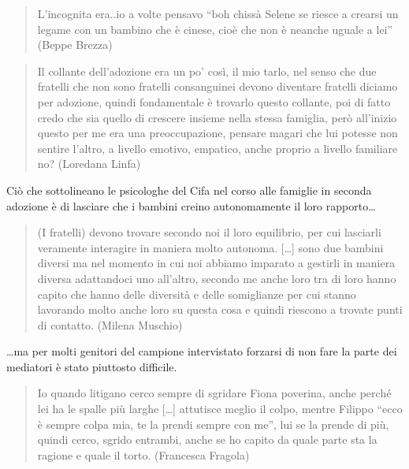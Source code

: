 \documentclass[12pt,oneside,svgnames]{memoir}
\newenvironment{quotationb}%
{\color{maincolor}\begin{leftbar}\begin{quotation}}%
{\end{quotation}\end{leftbar}\ignorespacesafterend}
\begin{document}
\begin{quotationb}
L'incognita era..io a volte pensavo ``boh chissà Selene se riesce a
crearsi un legame con un bambino che è cinese, cioè che non è neanche
uguale a lei'' (Beppe Brezza)
\end{quotationb}

\begin{quotationb}
Il collante dell'adozione era un po' così, il mio tarlo, nel senso che
due fratelli che non sono fratelli consanguinei devono diventare
fratelli diciamo per adozione, quindi fondamentale è trovarlo questo
collante, poi di fatto credo che sia quello di crescere insieme nella
stessa famiglia, però all'inizio questo per me era una preoccupazione,
pensare magari che lui potesse non sentire l'altro, a livello emotivo,
empatico, anche proprio a livello familiare no? (Loredana Linfa)
\end{quotationb}

Ciò che sottolineano le psicologhe del Cifa nel corso alle famiglie in
seconda adozione è di lasciare che i bambini creino autonomamente il
loro rapporto\ldots{}

\begin{quotationb}
(I fratelli) devono trovare secondo noi il loro equilibrio, per cui
lasciarli veramente interagire in maniera molto autonoma. {[}\ldots{}{]}
sono due bambini diversi ma nel momento in cui noi abbiamo imparato a
gestirli in maniera diversa adattandoci uno all'altro, secondo me anche
loro tra di loro hanno capito che hanno delle diversità e delle
somiglianze per cui stanno lavorando molto anche loro su questa cosa e
quindi riescono a trovate punti di contatto. (Milena Muschio)
\end{quotationb}

\ldots{}ma per molti genitori del campione intervistato forzarsi di non
fare la parte dei mediatori è stato piuttosto difficile.

\begin{quotationb}
Io quando litigano cerco sempre di sgridare Fiona poverina, anche perché
lei ha le spalle più larghe {[}\ldots{}{]} attutisce meglio il colpo,
mentre Filippo ``ecco è sempre colpa mia, te la prendi sempre con me'',
lui se la prende di più, quindi cerco, sgrido entrambi, anche se ho
capito da quale parte sta la ragione e quale il torto. (Francesca
Fragola)
\end{quotationb}
\end{document}
